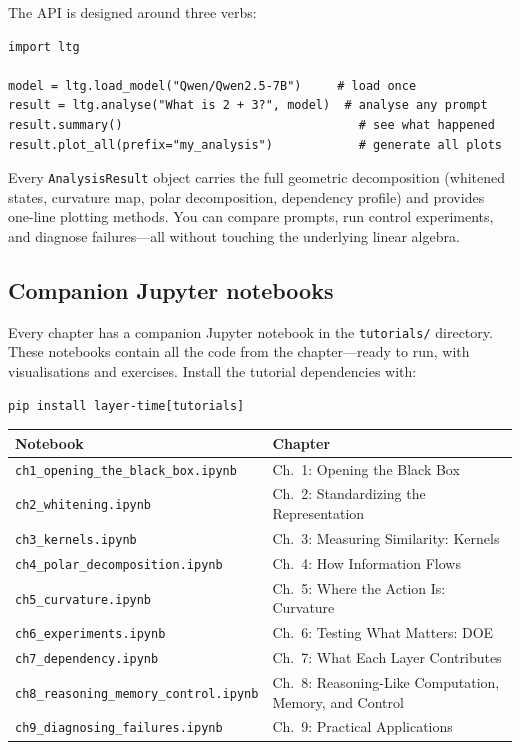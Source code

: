 \documentclass[11pt, twoside, openright]{memoir}
\begin{document}
The API is designed around three verbs:
\begin{lstlisting}[caption={The entire ltg workflow in four lines}]
import ltg

model = ltg.load_model("Qwen/Qwen2.5-7B")     # load once
result = ltg.analyse("What is 2 + 3?", model)  # analyse any prompt
result.summary()                                 # see what happened
result.plot_all(prefix="my_analysis")            # generate all plots
\end{lstlisting}

Every \texttt{AnalysisResult} object carries the full geometric decomposition
(whitened states, curvature map, polar decomposition, dependency profile) and
provides one-line plotting methods. You can compare prompts, run control
experiments, and diagnose failures---all without touching the underlying
linear algebra.

\subsection*{Companion Jupyter notebooks}

Every chapter has a companion Jupyter notebook in the \texttt{tutorials/}
directory. These notebooks contain all the code from the chapter---ready to
run, with visualisations and exercises. Install the tutorial dependencies
with:
\begin{lstlisting}[caption={Install tutorial extras}]
pip install layer-time[tutorials]
\end{lstlisting}

\begin{center}
\small
\begin{tabular}{@{}ll@{}}
\toprule
\textbf{Notebook} & \textbf{Chapter} \\
\midrule
\texttt{ch1\_opening\_the\_black\_box.ipynb}  & Ch.~1: Opening the Black Box \\
\texttt{ch2\_whitening.ipynb}                  & Ch.~2: Standardizing the Representation \\
\texttt{ch3\_kernels.ipynb}                    & Ch.~3: Measuring Similarity: Kernels \\
\texttt{ch4\_polar\_decomposition.ipynb}       & Ch.~4: How Information Flows \\
\texttt{ch5\_curvature.ipynb}                  & Ch.~5: Where the Action Is: Curvature \\
\texttt{ch6\_experiments.ipynb}                & Ch.~6: Testing What Matters: DOE \\
\texttt{ch7\_dependency.ipynb}                 & Ch.~7: What Each Layer Contributes \\
\texttt{ch8\_reasoning\_memory\_control.ipynb} & Ch.~8: Reasoning-Like Computation, Memory, and Control \\
\texttt{ch9\_diagnosing\_failures.ipynb}       & Ch.~9: Practical Applications \\
\bottomrule
\end{tabular}
\end{center}
\end{document}
